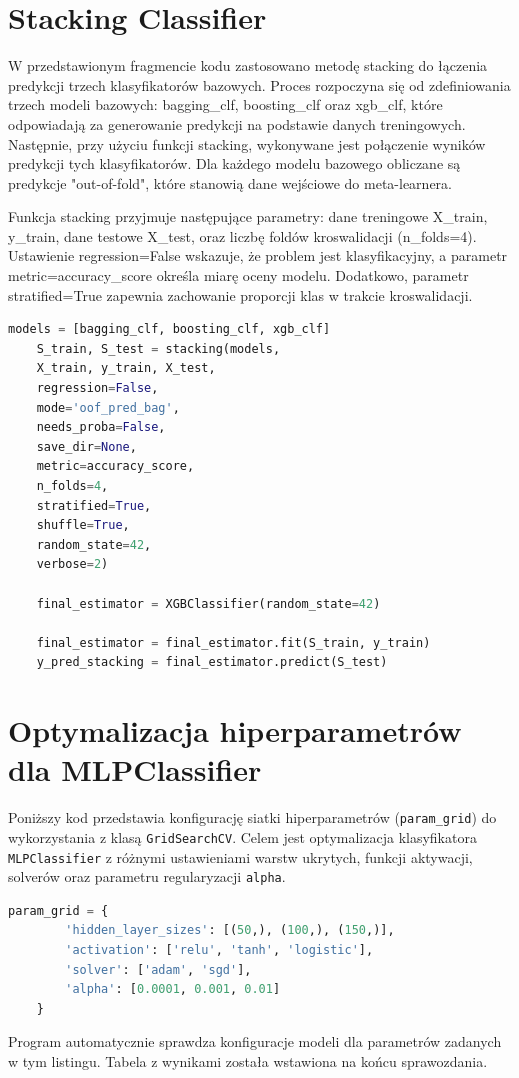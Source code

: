 \documentclass[polish,11pt,a4paper]{article}
\begin{document}
\section{Stacking Classifier}
W przedstawionym fragmencie kodu zastosowano metodę stacking do łączenia predykcji trzech klasyfikatorów bazowych. Proces rozpoczyna się od zdefiniowania trzech modeli bazowych: bagging\_clf, boosting\_clf oraz xgb\_clf, które odpowiadają za generowanie predykcji na podstawie danych treningowych. Następnie, przy użyciu funkcji stacking, wykonywane jest połączenie wyników predykcji tych klasyfikatorów. Dla każdego modelu bazowego obliczane są predykcje "out-of-fold", które stanowią dane wejściowe do meta-learnera.

Funkcja stacking przyjmuje następujące parametry: dane treningowe X\_train, y\_train, dane testowe X\_test, oraz liczbę foldów kroswalidacji (n\_folds=4). Ustawienie regression=False wskazuje, że problem jest klasyfikacyjny, a parametr metric=accuracy\_score określa miarę oceny modelu. Dodatkowo, parametr stratified=True zapewnia zachowanie proporcji klas w trakcie kroswalidacji.

\begin{lstlisting}[language=Python]
	models = [bagging_clf, boosting_clf, xgb_clf] 
	S_train, S_test = stacking(models,                     
	X_train, y_train, X_test,   
	regression=False, 
	mode='oof_pred_bag', 
	needs_proba=False,
	save_dir=None, 
	metric=accuracy_score, 
	n_folds=4, 
	stratified=True,
	shuffle=True,  
	random_state=42,
	verbose=2)
	
	final_estimator = XGBClassifier(random_state=42)
	
	final_estimator = final_estimator.fit(S_train, y_train)
	y_pred_stacking = final_estimator.predict(S_test)
\end{lstlisting}

\section{Optymalizacja hiperparametrów dla MLPClassifier}

Poniższy kod przedstawia konfigurację siatki hiperparametrów (\texttt{param\_grid}) do wykorzystania z klasą \texttt{GridSearchCV}. Celem jest optymalizacja klasyfikatora \texttt{MLPClassifier} z różnymi ustawieniami warstw ukrytych, funkcji aktywacji, solverów oraz parametru regularyzacji \texttt{alpha}.

\begin{lstlisting}[language=Python]
	param_grid = {
		'hidden_layer_sizes': [(50,), (100,), (150,)],  
		'activation': ['relu', 'tanh', 'logistic'],    
		'solver': ['adam', 'sgd'],                    
		'alpha': [0.0001, 0.001, 0.01]                 
	}
\end{lstlisting}
Program automatycznie sprawdza konfiguracje modeli dla parametrów zadanych w tym listingu. Tabela z wynikami została wstawiona na końcu sprawozdania. 
\end{document}
